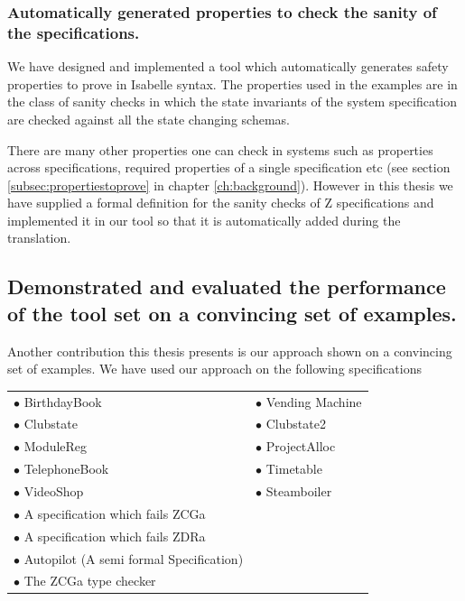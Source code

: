\subsubsection{Automatically generated properties to check the sanity of the specifications.}
We have designed and
implemented a tool which automatically generates safety properties to prove in
Isabelle syntax. The properties used in the examples are in the class of sanity
checks in which the state invariants of the system specification are checked
against all the state changing schemas.

There are many other properties one can check in systems such as properties
across specifications, required properties of a single specification etc (see
section \ref{subsec:propertiestoprove} in chapter \ref{ch:background}).
However in this thesis we have supplied a formal definition for the sanity
checks of Z specifications and implemented it in our tool so that it is
automatically added during the translation.


\subsection{Demonstrated and evaluated the performance of the tool set on a convincing set of examples.}

Another contribution this thesis presents is our approach shown on a convincing
set of examples. We have used our approach on the following specifications

\begin{tabular}{l l}
$\bullet$ BirthdayBook \cite{spiveyreferencemanual} & $\bullet$ Vending Machine
\cite{pp} \\
$\bullet$ Clubstate \cite{essenceofz} & $\bullet$ Clubstate2 \cite{essenceofz}
\\
$\bullet$ ModuleReg \cite{essenceofz} & $\bullet$ ProjectAlloc \cite{essenceofz}
\\
$\bullet$ TelephoneBook & $\bullet$ Timetable \cite{essenceofz} \\
$\bullet$ VideoShop \cite{essenceofz} & $\bullet$ Steamboiler
\cite{steamboilerslides} \\
$\bullet$ A specification which fails ZCGa & \\
$\bullet$ A specification which fails ZDRa & \\
$\bullet$ Autopilot (A semi formal Specification) \cite{Butler96} & \\
$\bullet$ The ZCGa type checker & \\
\end{tabular}


